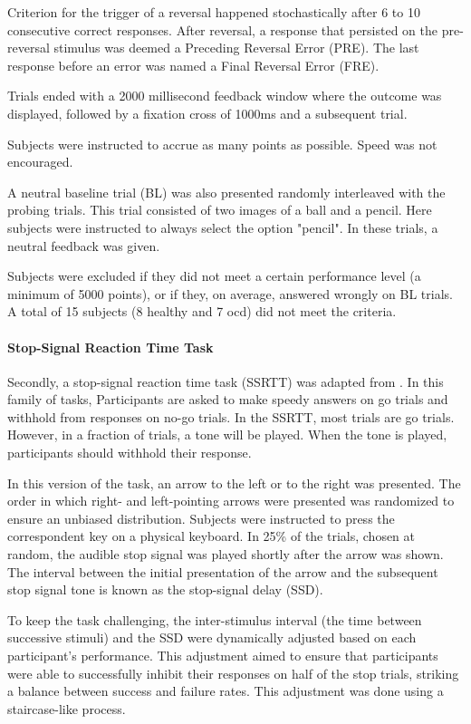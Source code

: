 \documentclass[11pt]{article}
\begin{document}
Criterion for the trigger of a reversal happened stochastically after 6 to 10 consecutive correct responses. After reversal, a response that persisted on the pre-reversal stimulus was deemed a Preceding Reversal Error (PRE). The last response before an error was named a Final Reversal Error (FRE).

Trials ended with a 2000 millisecond feedback window where the outcome was displayed, followed by a fixation cross of 1000ms and a subsequent trial.

Subjects were instructed to accrue as many points as possible. Speed was not encouraged.

A neutral baseline trial (BL) was also presented randomly interleaved with the probing trials. This trial consisted of two images of a ball and a pencil. Here subjects were instructed to always select the option "pencil". In these trials, a neutral feedback was given.

Subjects were excluded if they did not meet a certain performance level (a minimum of 5000 points), or if they, on average, answered wrongly on BL trials. A total of 15 subjects (8 healthy and 7 ocd) did not meet the criteria.

\paragraph{Stop-Signal Reaction Time Task}
Secondly, a stop-signal reaction time task (SSRTT) was adapted from \cite{aron2003stop}. In this family of tasks, Participants are asked to make speedy answers on go trials and withhold from responses on no-go trials.
In the SSRTT, most trials are go trials. However, in a fraction of trials, a tone will be played. When the tone is played, participants should withhold their response.

In this version of the task, an arrow to the left or to the right was presented. The order in which right- and left-pointing arrows were presented was randomized to ensure an unbiased distribution. Subjects were instructed to press the correspondent key on a physical keyboard. In 25\% of the trials, chosen at random, the audible stop signal was played shortly after the arrow was shown. The interval between the initial presentation of the arrow and the subsequent stop signal tone is known as the stop-signal delay (SSD).

To keep the task challenging, the inter-stimulus interval (the time between successive stimuli) and the SSD were dynamically adjusted based on each participant's performance. This adjustment aimed to ensure that participants were able to successfully inhibit their responses on half of the stop trials, striking a balance between success and failure rates. This adjustment was done using a staircase-like process.
\end{document}
